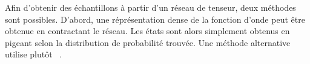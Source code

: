 Afin d'obtenir des échantillons à partir d'un réseau de tenseur, deux méthodes sont possibles. D'abord, une réprésentation dense de la fonction d'onde peut être obtenue en contractant le réseau. Les états sont alors simplement obtenus en pigeant selon la distribution de probabilité trouvée. Une méthode alternative utilise plutôt ~\cite{ferrisPerfectSamplingUnitary2012}. 






